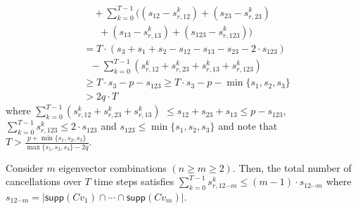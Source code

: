 \documentclass[twocolumn]{autart}    %
\begin{document}
{\begin{equation}
\begin{aligned}
	& \quad+ \sum_{k=0}^ {T-1} \bigg (  (s_{12} - s_{r,12}^k ) + (s_{23} - s_{r,23}^k) \\ &~~~~~~~+ (s_{13} - s_{r,13}^k) + ( s_{123} - s_{r,123}^k) \bigg) \\
	&= T \cdot (s_3 + s_1 + s_2 - s_{12} - s_{13} - s_{23} - 2 \cdot s_{123}) \\&~~~ - \sum_{k=0}^{T-1} ( s_{r,12}^k + s_{r,23}^k + s_{r,13}^k  + s_{r,123}^k ) \\
	& \ge T \cdot s_3 - p - s_{123} \ge T \cdot s_3 - p - \min \{ s_1, s_2, s_3 \} \\
	& > 2q \cdot T
		\nonumber 
\end{aligned}
\end{equation}
where
$\sum_{k=0}^{T-1} (s_{r,12}^k + s_{r,23}^k + s_{r,13}^k   )$ $\le s_{12} + s_{23} + s_{13} $$ \le p - s_{123}$, $\sum_{k=0}^{T-1} s_{r,123}^k \le 2 \cdot s_{123}$ and $ s_{123} \le \min \{ s_1, s_2, s_3 \}$ and note that $T > \frac { p + \min \{ s_1, s_2, s_3 \}} { \max \{s_1, s_2, s_3 \} - 2q }$.
}
\begin{prop} \label{prop:m_vec}
Consider $m$ eigenvector combinations $(n\ge m \ge 2)$. Then, the total number of cancellations over $T$ time steps satisfies $\sum_{k=0}^{T-1} s_{r,12 \cdots m}^k \le (m-1)\cdot s_{12 \cdots m}$ where $s_{12\cdots m} = \lvert \textsf{supp} (Cv_1) \cap \cdots \cap \textsf{supp} (Cv_m) \rvert$.
\end{prop}
\end{document}
